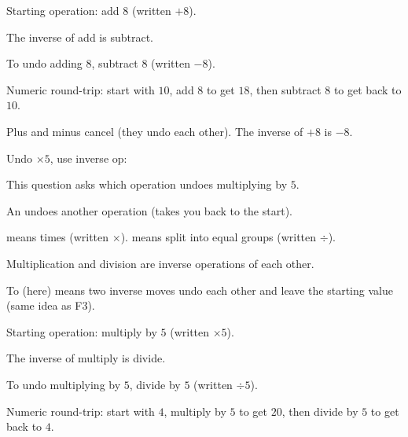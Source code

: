 \begin{steps}
  \item Starting operation: add $8$ (written $+8$).
  \item The inverse of add is subtract.
  \item To undo adding $8$, subtract $8$ (written $-8$).
  \item Numeric round-trip: start with $10$, add $8$ to get $18$, then subtract $8$ to
        get back to $10$.
\end{steps}


\noindent Plus and minus cancel (they undo each other). The inverse of $+8$ is
$-8$.


\noindent Undo $\times 5$, use inverse op: \blank[2.4cm]


\noindent This question asks which operation undoes multiplying by $5$.

\begin{words}
  \item An undoes another operation (takes you back to the start).
  \item {}means times (written $\times$). means split
        into equal groups (written $\div$).
  \item Multiplication and division are inverse operations of each other.
  \item To (here) means two inverse moves undo each other and leave the
        starting value (same idea as F3).
\end{words}

\begin{steps}
  \item Starting operation: multiply by $5$ (written $\times 5$).
  \item The inverse of multiply is divide.
  \item To undo multiplying by $5$, divide by $5$ (written $\div 5$).
  \item Numeric round-trip: start with $4$, multiply by $5$ to get $20$, then divide by
        $5$ to get back to $4$.
\end{steps}

